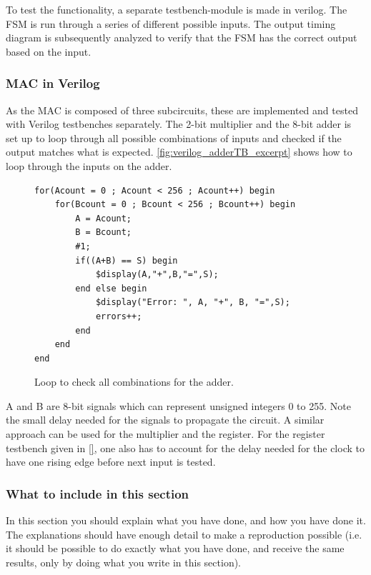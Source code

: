 To test the functionality, a separate testbench-module is made in verilog. The FSM is run through a series of different possible inputs. The output timing diagram is subsequently analyzed to verify that the FSM has the correct output based on the input.

\subsubsection{MAC in Verilog}
\label{subsubsec:MAC_in_verilog}

As the MAC is composed of three subcircuits, these are implemented and tested with Verilog testbenches separately. The 2-bit multiplier and the 8-bit adder is set up to loop through all possible combinations of inputs and checked if the output matches what is expected. \autoref{fig:verilog_adderTB_excerpt} shows how to loop through the inputs on the adder.

\begin{figure}[H]
\centering
\caption{Loop to check all combinations for the adder.}
\label{fig:verilog_adderTB_excerpt}
\begin{minipage}{0.8\textwidth}
\begin{lstlisting}[style=verilogStyle]
for(Acount = 0 ; Acount < 256 ; Acount++) begin
    for(Bcount = 0 ; Bcount < 256 ; Bcount++) begin
        A = Acount;
        B = Bcount;
        #1;
        if((A+B) == S) begin
            $display(A,"+",B,"=",S);
        end else begin
            $display("Error: ", A, "+", B, "=",S);
            errors++;
        end
    end
end
\end{lstlisting}
\end{minipage}
\end{figure}

A and B are 8-bit signals which can represent unsigned integers 0 to 255. Note the small delay needed for the signals to propagate the circuit. A similar approach can be used for the multiplier and the register. For the register testbench given in \autoref{}, one also has to account for the delay needed for the clock to have one rising edge before next input is tested.

\subsubsection{What to include in this section}

In this section you should explain what you have done, and how you have done it. The explanations should have enough detail to make a reproduction possible (i.e. it should be possible to do exactly what you have done, and receive the same results, only by doing what you write in this section).


